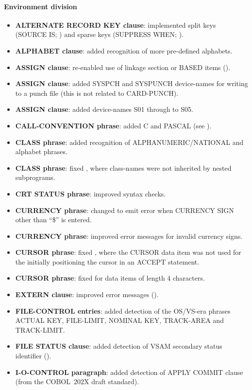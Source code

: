 \paragraph{Environment division}
\begin{itemize}
\item \textbf{ALTERNATE RECORD KEY clause}: implemented split keys (SOURCE IS; ) and sparse keys (SUPPRESS WHEN; ).
\item \textbf{ALPHABET clause}: added recognition of more pre-defined alphabets.
\item \textbf{ASSIGN clause}: re-enabled use of linkage section or BASED items ().
\item \textbf{ASSIGN clause}: added SYSPCH and SYSPUNCH device-names for writing to a punch file (this is not related to CARD-PUNCH).
\item \textbf{ASSIGN clause}: added device-names S01 through to S05.
\item \textbf{CALL-CONVENTION phrase}: added C and PASCAL (see ).
\item \textbf{CLASS phrase}: added recognition of ALPHANUMERIC\slash{}NATIONAL and alphabet phrases.
\item \textbf{CLASS phrase}: fixed , where class-names were not inherited by nested subprograms.
\item \textbf{CRT STATUS phrase}: improved syntax checks.
\item \textbf{CURRENCY phrase}: changed to emit error when CURRENCY SIGN other than ``\$'' is entered.
\item \textbf{CURRENCY phrase}: improved error messages for invalid currency signs.
\item \textbf{CURSOR phrase}: fixed , where the CURSOR data item was not used for the initially positioning the cursor in an ACCEPT statement.
\item \textbf{CURSOR phrase}: fixed for data items of length 4 characters.
\item \textbf{EXTERN clause}: improved error messages ().
\item \textbf{FILE-CONTROL entries}: added detection of the OS/VS-era phrases ACTUAL KEY, FILE-LIMIT, NOMINAL KEY, TRACK-AREA and TRACK-LIMIT.
\item \textbf{FILE STATUS clause}: added detection of VSAM secondary status identifier ().
\item \textbf{I-O-CONTROL paragraph}: added detection of APPLY COMMIT clause (from the COBOL~202X draft standard).

\end{itemize}
